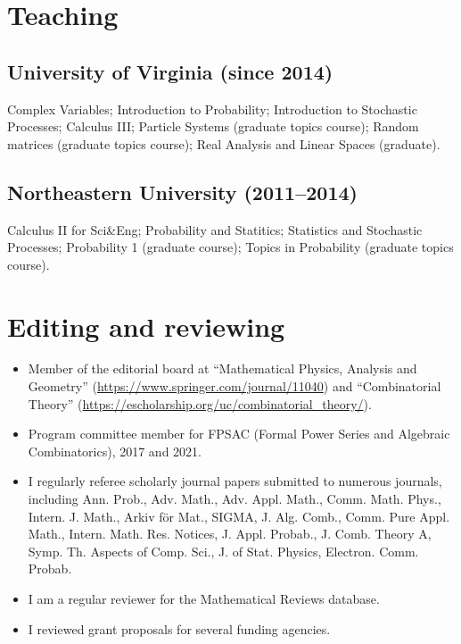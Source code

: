 \documentclass[letterpaper,11pt]{article}
\begin{document}
\section*{Teaching}

\subsection*{University of Virginia (since 2014)}

Complex Variables;
Introduction to Probability; 
Introduction to Stochastic Processes;
Calculus III;
Particle Systems (graduate topics course);
Random matrices (graduate topics course);
Real Analysis and Linear Spaces (graduate).

\subsection*{Northeastern University (2011--2014)}

Calculus II for Sci\&Eng;
Probability and Statitics;
Statistics and Stochastic Processes; 
Probability 1 (graduate course);
Topics in Probability (graduate topics course).

\section*{Editing and reviewing}

\begin{itemize}
	\item
	Member of the editorial board at ``Mathematical Physics, Analysis and Geometry'' (\url{https://www.springer.com/journal/11040}) and ``Combinatorial Theory'' (\url{https://escholarship.org/uc/combinatorial_theory/}).
	\item Program committee member for FPSAC (Formal Power Series and Algebraic Combinatorics),
		2017 and 2021.
	\item 
	I regularly referee scholarly journal papers submitted to numerous journals, 
	including
	Ann. Prob., Adv. Math., Adv. Appl. Math., Comm. Math. Phys., Intern. J. Math.,
	Arkiv f\"or Mat., SIGMA, J. Alg. Comb., Comm. Pure Appl. Math., Intern. Math.
	Res. Notices, J. Appl. Probab., J. Comb. Theory A, Symp. Th. Aspects of Comp.
	Sci., J. of Stat. Physics, Electron. Comm. Probab. 
	\item
	I am a regular
	reviewer for the Mathematical Reviews database. 
	\item
	I reviewed grant proposals for several funding agencies.
\end{itemize}
\end{document}

